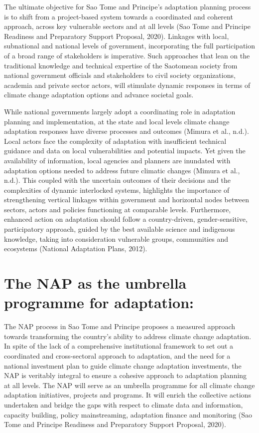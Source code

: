 \documentclass[
]{book}
\begin{document}
The ultimate objective for Sao Tome and Principe's adaptation planning process is to shift from a project-based system towards a coordinated and coherent approach, across key vulnerable sectors and at all levels (Sao Tome and Principe Readiness and Preparatory Support Proposal, 2020). Linkages with local, subnational and national levels of government, incorporating the full participation of a broad range of stakeholders is imperative. Such approaches that lean on the traditional knowledge and technical expertise of the Saotomean society from national government officials and stakeholders to civil society organizations, academia and private sector actors, will stimulate dynamic responses in terms of climate change adaptation options and advance societal goals.

While national governments largely adopt a coordinating role in adaptation planning and implementation, at the state and local levels climate change adaptation responses have diverse processes and outcomes (Mimura et al., n.d.). Local actors face the complexity of adaptation with insufficient technical guidance and data on local vulnerabilities and potential impacts. Yet given the availability of information, local agencies and planners are inundated with adaptation options needed to address future climatic changes (Mimura et al., n.d.). This coupled with the uncertain outcomes of their decisions and the complexities of dynamic interlocked systems, highlights the importance of strengthening vertical linkages within government and horizontal nodes between sectors, actors and policies functioning at comparable levels. Furthermore, enhanced action on adaptation should follow a country-driven, gender-sensitive, participatory approach, guided by the best available science and indigenous knowledge, taking into consideration vulnerable groups, communities and ecosystems (National Adaptation Plans, 2012).

\hypertarget{the-nap-as-the-umbrella-programme-for-adaptation}{%
\section{The NAP as the umbrella programme for adaptation:}\label{the-nap-as-the-umbrella-programme-for-adaptation}}

The NAP process in Sao Tome and Principe proposes a measured approach towards transforming the country's ability to address climate change adaptation. In spite of the lack of a comprehensive institutional framework to set out a coordinated and cross-sectoral approach to adaptation, and the need for a national investment plan to guide climate change adaptation investments, the NAP is veritably integral to ensure a cohesive approach to adaptation planning at all levels. The NAP will serve as an umbrella programme for all climate change adaptation initiatives, projects and programs. It will enrich the collective actions undertaken and bridge the gaps with respect to climate data and information, capacity building, policy mainstreaming, adaptation finance and monitoring (Sao Tome and Principe Readiness and Preparatory Support Proposal, 2020).
\end{document}
